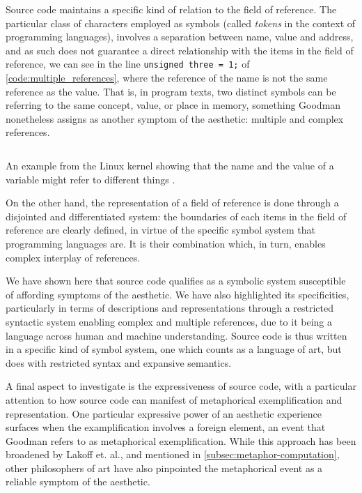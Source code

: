 Source code maintains a specific kind of relation to the field of reference. The particular class of characters employed as symbols (called \emph{tokens} in the context of programming languages), involves a separation between name, value and address, and as such does not guarantee a direct relationship with the items in the field of reference, we can see in the line \lstinline{unsigned three = 1;} of  \ref{code:multiple_references}, where the reference of the name is not the same reference as the value. That is, in program texts, two distinct symbols can be referring to the same concept, value, or place in memory, something Goodman nonetheless assigns as another symptom of the aesthetic: multiple and complex references.

\begin{listing}
    \inputminted{c}{./corpus/multiple_references.c}
    \caption{An example from the Linux kernel showing that the name and the value of a variable might refer to different things \citep{linux_fs_2023}.}
    \label{code:multiple_references}
\end{listing}

On the other hand, the representation of a field of reference is done through a disjointed and differentiated system: the boundaries of each items in the field of reference are clearly defined, in virtue of the specific symbol system that programming languages are. It is their combination which, in turn, enables complex interplay of references.

We have shown here that source code qualifies as a symbolic system susceptible of affording symptoms of the aesthetic. We have also highlighted its specificities, particularly in terms of descriptions and representations through a restricted syntactic system enabling complex and multiple references, due to it being a language across human and machine understanding. Source code is thus written in a specific kind of symbol system, one which counts as a language of art, but does with restricted syntax and expansive semantics. 

A final aspect to investigate is the expressiveness of source code, with a particular attention to how source code can manifest of metaphorical exemplification and representation. One particular expressive power of an aesthetic experience surfaces when the examplification involves a foreign element, an event that Goodman refers to as metaphorical exemplification. While this approach has been broadened by Lakoff et. al., and mentioned in \ref{subsec:metaphor-computation}, other philosophers of art have also pinpointed the metaphorical event as a reliable symptom of the aesthetic.

